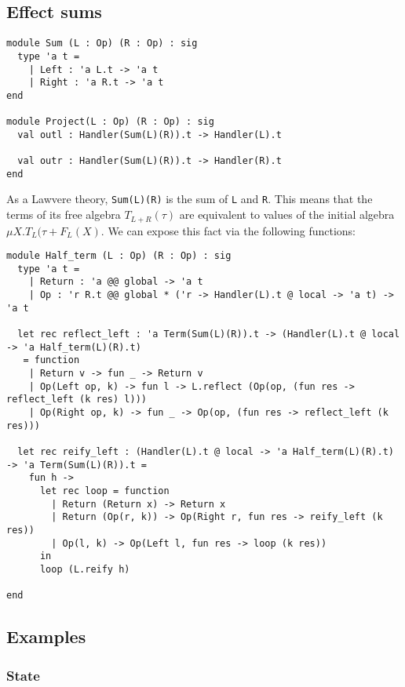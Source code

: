 \documentclass[acmsmall, screen, nonacm]{acmart}
\begin{document}
\subsection{Effect sums}

\begin{lstlisting}[style=ocaml]
module Sum (L : Op) (R : Op) : sig
  type 'a t =
    | Left : 'a L.t -> 'a t
    | Right : 'a R.t -> 'a t
end

module Project(L : Op) (R : Op) : sig
  val outl : Handler(Sum(L)(R)).t -> Handler(L).t

  val outr : Handler(Sum(L)(R)).t -> Handler(R).t
end
\end{lstlisting}

As a Lawvere theory, \lstinline[style=ocaml]{Sum(L)(R)} is the sum of
\lstinline[style=ocaml]{L} and \lstinline[style=ocaml]{R}. This means
that the terms of its free algebra $T_{L + R}(\tau)$ are equivalent to
values of the initial algebra $\mu X. T_L(\tau + F_L(X)$. We can expose
this fact via the following functions:
\begin{lstlisting}
module Half_term (L : Op) (R : Op) : sig
  type 'a t =
    | Return : 'a @@ global -> 'a t
    | Op : 'r R.t @@ global * ('r -> Handler(L).t @ local -> 'a t) -> 'a t

  let rec reflect_left : 'a Term(Sum(L)(R)).t -> (Handler(L).t @ local -> 'a Half_term(L)(R).t)
   = function
    | Return v -> fun _ -> Return v
    | Op(Left op, k) -> fun l -> L.reflect (Op(op, (fun res -> reflect_left (k res) l)))
    | Op(Right op, k) -> fun _ -> Op(op, (fun res -> reflect_left (k res)))

  let rec reify_left : (Handler(L).t @ local -> 'a Half_term(L)(R).t) -> 'a Term(Sum(L)(R)).t =
    fun h ->
      let rec loop = function
        | Return (Return x) -> Return x
        | Return (Op(r, k)) -> Op(Right r, fun res -> reify_left (k res))
        | Op(l, k) -> Op(Left l, fun res -> loop (k res))
      in
      loop (L.reify h)

end
\end{lstlisting}

\subsection{Examples}

\subsubsection{State}
\end{document}
